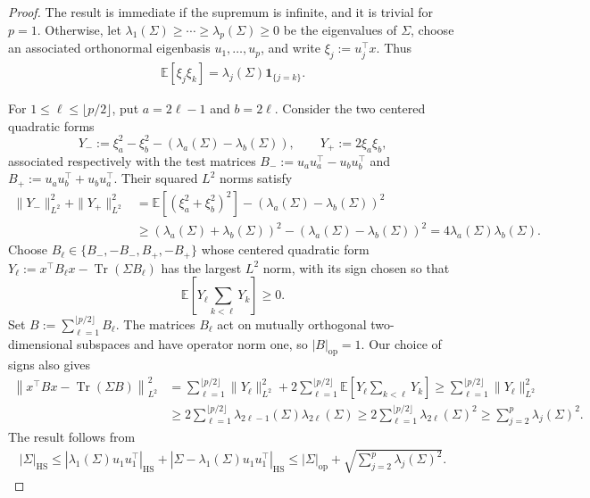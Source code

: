 \documentclass[EJP, preprint, NODS, nobera, nofontexpansion]{ejpecp}
\DeclareMathOperator{\op}{op}
\DeclareMathOperator{\tr}{Tr}
\DeclareMathOperator{\hs}{HS}
\begin{document}
\begin{proof}
    The result is immediate if the supremum is infinite, and it is trivial for
$p=1$.  Otherwise, let
$\lambda_1(\Sigma)\geq\cdots\geq\lambda_p(\Sigma)\geq0$ be the
eigenvalues of $\Sigma$, choose an associated orthonormal eigenbasis
$u_1,\ldots,u_p$, and write $\xi_j:=u_j^\top x$.  Thus
\begin{align*}
    \mathbb E[\xi_j\xi_k]
    =\lambda_j(\Sigma)\mathbf1_{\{j=k\}}.
\end{align*}

For $1\leq\ell\leq\lfloor p/2\rfloor$, put $a=2\ell-1$ and
$b=2\ell$.  Consider the two centered quadratic forms
\[
    Y_-:=\xi_a^2-\xi_b^2
       -(\lambda_a(\Sigma)-\lambda_b(\Sigma)),
    \qquad
    Y_+:=2\xi_a\xi_b,
\]
associated respectively with the test matrices
$B_-:=u_au_a^\top-u_bu_b^\top$ and
$B_+:=u_au_b^\top+u_bu_a^\top$.
Their squared $L^2$ norms satisfy
\begin{align*}
    \|Y_-\|_{L^2}^2+\|Y_+\|_{L^2}^2
    &=\mathbb E\left[(\xi_a^2+\xi_b^2)^2\right]
      -(\lambda_a(\Sigma)-\lambda_b(\Sigma))^2
    \\
    &\geq
      (\lambda_a(\Sigma)+\lambda_b(\Sigma))^2
      -(\lambda_a(\Sigma)-\lambda_b(\Sigma))^2
    =4\lambda_a(\Sigma)\lambda_b(\Sigma).
\end{align*}
Choose $B_\ell\in\{B_-,-B_-,B_+,-B_+\}$ whose centered quadratic
form $Y_\ell:=x^\top B_\ell x-\tr(\Sigma B_\ell)$
has the largest $L^2$ norm, with its sign chosen so that
\[
    \mathbb E\!\left[
        Y_\ell\sum_{k<\ell}Y_k
    \right]\geq0.
\]
Set $B:=\sum_{\ell=1}^{\lfloor p/2\rfloor}B_\ell$.
The matrices $B_\ell$ act on mutually orthogonal two-dimensional
subspaces and have operator norm one, so $|B|_{\op}=1$.
Our choice of signs also gives
\begin{align}
    \left\|x^\top Bx-\tr(\Sigma B)\right\|_{L^2}^2
    &=
    \sum_{\ell=1}^{\lfloor p/2\rfloor}\|Y_\ell\|_{L^2}^2
    +
    2\sum_{\ell=1}^{\lfloor p/2\rfloor}
        \mathbb E\!\left[
            Y_\ell\sum_{k<\ell}Y_k
        \right]
    \geq
    \sum_{\ell=1}^{\lfloor p/2\rfloor}\|Y_\ell\|_{L^2}^2\nonumber\\
    &\geq
    2\sum_{\ell=1}^{\lfloor p/2\rfloor}\lambda_{2\ell-1}(\Sigma)\lambda_{2\ell}(\Sigma)
    \geq
    2\sum_{\ell=1}^{\lfloor p/2\rfloor}\lambda_{2\ell}(\Sigma)^2 
    \geq \sum_{j=2}^p\lambda_j(\Sigma)^2.
    \label{eq:quadratic_form_spectral_spread}
\end{align}
The result follows from 
\begin{align*}
    |\Sigma|_{\hs} 
    \leq |\lambda_1(\Sigma)u_1u_1^\top|_{\hs}  + 
    |\Sigma-\lambda_1(\Sigma) u_1u_1^\top|_{\hs}
    \leq|\Sigma|_{\op}  + 
    \sqrt{\sum_{j=2}^p\lambda_j(\Sigma)^2}.
\end{align*}
\end{proof}
\end{document}
